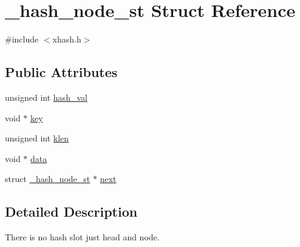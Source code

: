 \hypertarget{struct__hash__node__st}{\section{\-\_\-hash\-\_\-node\-\_\-st Struct Reference}
\label{struct__hash__node__st}
}


{\ttfamily \#include $<$xhash.\-h$>$}

\subsection*{Public Attributes}
\begin{DoxyCompactItemize}
\item 
unsigned int \hyperlink{struct__hash__node__st_ae0765732bd23e72aa2168d90d117ddf2}{hash\-\_\-val}
\item 
void $\ast$ \hyperlink{struct__hash__node__st_a0c6ce46fbc8b8aeb82ce7e999f6ca8ee}{key}
\item 
unsigned int \hyperlink{struct__hash__node__st_a1a3c1d7f708e607fedee3d83c2961a4f}{klen}
\item 
void $\ast$ \hyperlink{struct__hash__node__st_aef60dd275e956b132b025fbb51707fe7}{data}
\item 
struct \hyperlink{struct__hash__node__st}{\-\_\-hash\-\_\-node\-\_\-st} $\ast$ \hyperlink{struct__hash__node__st_a6bc5ff6e2160de48ebf6e3bba36becd3}{next}
\end{DoxyCompactItemize}


\subsection{Detailed Description}
There is no hash slot just head and node. 

